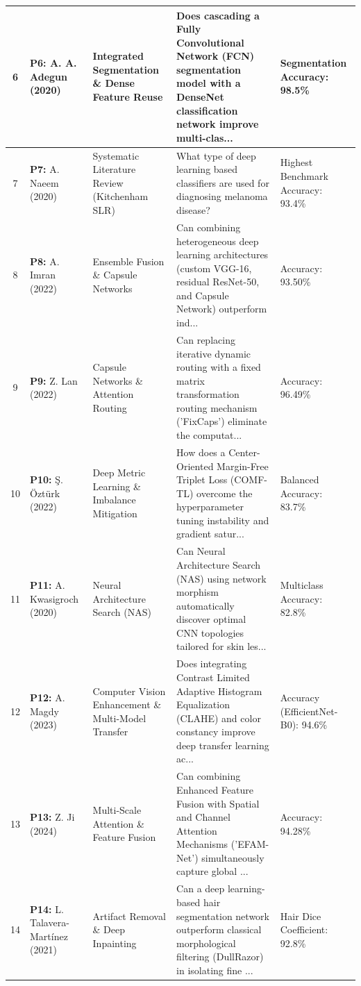 \begin{small}
\begin{longtable}{|c|p{3.2cm}|p{2.8cm}|p{5.2cm}|p{2.4cm}|}
6 & \textbf{P6:} A. A. Adegun (2020)~\cite{9167192} & Integrated Segmentation \& Dense Feature Reuse & Does cascading a Fully Convolutional Network (FCN) segmentation model with a DenseNet classification network improve multi-clas... & Segmentation Accuracy: 98.5\% \\ \hline
7 & \textbf{P7:} A. Naeem (2020)~\cite{9113301} & Systematic Literature Review (Kitchenham SLR) & What type of deep learning based classifiers are used for diagnosing melanoma disease? & Highest Benchmark Accuracy: 93.4\% \\ \hline
8 & \textbf{P8:} A. Imran (2022)~\cite{9940917} & Ensemble Fusion \& Capsule Networks & Can combining heterogeneous deep learning architectures (custom VGG-16, residual ResNet-50, and Capsule Network) outperform ind... & Accuracy: 93.50\% \\ \hline
9 & \textbf{P9:} Z. Lan (2022)~\cite{9791221} & Capsule Networks \& Attention Routing & Can replacing iterative dynamic routing with a fixed matrix transformation routing mechanism ('FixCaps') eliminate the computat... & Accuracy: 96.49\% \\ \hline
10 & \textbf{P10:} Ş. Öztürk (2022)~\cite{9810181} & Deep Metric Learning \& Imbalance Mitigation & How does a Center-Oriented Margin-Free Triplet Loss (COMF-TL) overcome the hyperparameter tuning instability and gradient satur... & Balanced Accuracy: 83.7\% \\ \hline
11 & \textbf{P11:} A. Kwasigroch (2020)~\cite{8950333} & Neural Architecture Search (NAS) & Can Neural Architecture Search (NAS) using network morphism automatically discover optimal CNN topologies tailored for skin les... & Multiclass Accuracy: 82.8\% \\ \hline
12 & \textbf{P12:} A. Magdy (2023)~\cite{10181245} & Computer Vision Enhancement \& Multi-Model Transfer & Does integrating Contrast Limited Adaptive Histogram Equalization (CLAHE) and color constancy improve deep transfer learning ac... & Accuracy (EfficientNet-B0): 94.6\% \\ \hline
13 & \textbf{P13:} Z. Ji (2024)~\cite{10695064} & Multi-Scale Attention \& Feature Fusion & Can combining Enhanced Feature Fusion with Spatial and Channel Attention Mechanisms ('EFAM-Net') simultaneously capture global ... & Accuracy: 94.28\% \\ \hline
14 & \textbf{P14:} L. Talavera-Martínez (2021)~\cite{9306830} & Artifact Removal \& Deep Inpainting & Can a deep learning-based hair segmentation network outperform classical morphological filtering (DullRazor) in isolating fine ... & Hair Dice Coefficient: 92.8\% \\ \hline

\end{longtable}
\end{small}
